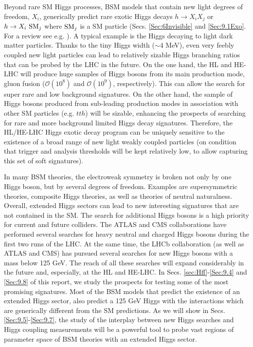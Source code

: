 Beyond rare SM Higgs processes, BSM models that contain new light degrees of freedom, $X_i$, generically predict rare exotic Higgs decays $h\to X_i X_j$ or $h\to X_i ~{\rm{SM}}_j$ where ${\rm{SM}}_j$ is a SM particle (Secs. \ref{Sec:6Invisible} and \ref{Sec:9.1Exo}. For a review see e.g. \cite{Curtin:2013fra}). A typical example is the Higgs decaying to light dark matter particles. Thanks to the tiny Higgs width ($\sim 4$ MeV), even very feebly coupled new light particles can lead to relatively sizable Higgs branching ratios that can be probed by the LHC in the future. On the one hand, the HL and HE-LHC will produce huge samples of Higgs bosons from its main production mode, gluon fusion ($\mathcal O(10^8)$ and $\mathcal O(10^9)$, respectively). This can allow the search for super rare and low background signatures. On the other hand, the sample of Higgs bosons produced from sub-leading  production modes in association with other SM particles (e.g. $tth$) will be sizable, enhancing the prospects of searching for rare and more background limited Higgs decay signatures. 
Therefore, the HL/HE-LHC Higgs exotic decay program can be uniquely sensitive to the existence of a broad range of new light weakly coupled particles (on condition that trigger and analysis thresholds will be kept relatively low, to allow capturing this set of soft signatures).


In many BSM theories, the electroweak symmetry is broken not only by one Higgs boson, but by several degrees of freedom. Examples are supersymmetric theories, composite Higgs theories, as well as theories of neutral naturalness. Overall, extended Higgs sectors can lead to new interesting signatures that are not contained in the SM. The search for additional Higgs bosons is a high priority for current and future colliders. The ATLAS and CMS collaborations have performed several searches for heavy neutral and charged Higgs bosons during the first two runs of the LHC. At the same time, the LHCb collaboration (as well as ATLAS and CMS) has pursued several searches for new Higgs bosons with a mass below 125 GeV.  The reach of all these searches will expand considerably in the future and, especially, at the HL and HE-LHC. In Secs. \ref{sec:Hff}-\ref{Sec:9.4} and \ref{Sec:9.8} of this report, we study the prospects for testing some of the most promising signatures.
Most of the BSM models that predict the existence of an extended Higgs sector, also predict a 125 GeV Higgs with the interactions which are generically different from the SM predictions. As we will show in Secs. \ref{Sec:9.5}-\ref{Sec:9.7}, the study of the interplay between new Higgs searches and Higgs coupling measurements will be a powerful tool to probe vast regions of parameter space of BSM theories with an extended Higgs sector.